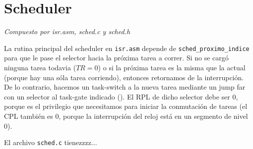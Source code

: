 \documentclass{article}
\begin{document}
	\section{Scheduler}
	\vspace{-1cm}
	\begin{flushright}
	\textit{Compuesto por isr.asm, sched.c y sched.h}
	\end{flushright}

	La rutina principal del scheduler en \texttt{isr.asm} depende de \texttt{sched\_proximo\_indice} para que le pase el selector hacia la próxima tarea a correr. Si no se cargó ninguna tarea todavia ($TR = 0$) o si la próxima tarea es la misma que la actual (porque hay una sóla tarea corriendo), entonces retornamos de la interrupción. De lo contrario, hacemos un task-switch a la nueva tarea mediante un jump far con un selector al task-gate indicado (). El RPL de dicho selector debe ser 0, porque es el privilegio que necesitamos para iniciar la conmutación de tareas (el CPL también es 0, porque la interrupción del reloj está en un segmento de nivel 0).

	El archivo \texttt{sched.c} tienezzzz...

\end{document}
